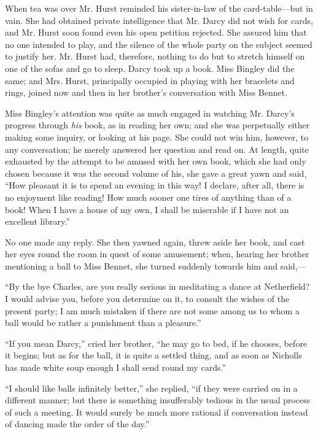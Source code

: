 \documentclass[12pt,openright]{book}
\begin{document}
When tea was over Mr. Hurst reminded his sister-in-law of the card-table—but in vain. She had obtained private intelligence that Mr. Darcy did not wish for cards, and Mr. Hurst soon found even his open petition rejected. She assured him that no one intended to play, and the silence of the whole party on the subject seemed to justify her. Mr. Hurst had, therefore, nothing to do but to stretch himself on one of the sofas and go to sleep. Darcy took up a book. Miss Bingley did the same; and Mrs. Hurst, principally occupied in playing with her bracelets and rings, joined now and then in her brother’s conversation with Miss Bennet.

Miss Bingley’s attention was quite as much engaged in watching Mr. Darcy’s progress through \textit{his} book, as in reading her own; and she was perpetually either making some inquiry, or looking at his page. She could not win him, however, to any conversation; he merely answered her question and read on. At length, quite exhausted by the attempt to be amused with her own book, which she had only chosen because it was the second volume of his, she gave a great yawn and said, “How pleasant it is to spend an evening in this way! I declare, after all, there is no enjoyment like reading! How much sooner one tires of anything than of a book! When I have a house of my own, I shall be miserable if I have not an excellent library.”

No one made any reply. She then yawned again, threw aside her book, and cast her eyes round the room in quest of some amusement; when, hearing her brother mentioning a ball to Miss Bennet, she turned suddenly towards him and said,—

“By the bye Charles, are you really serious in meditating a dance at Netherfield? I would advise you, before you determine on it, to consult the wishes of the present party; I am much mistaken if there are not some among us to whom a ball would be rather a punishment than a pleasure.”

“If you mean Darcy,” cried her brother, “he may go to bed, if he chooses, before it begins; but as for the ball, it is quite a settled thing, and as soon as Nicholls has made white soup enough I shall send round my cards.”

“I should like balls infinitely better,” she replied, “if they were carried on in a different manner; but there is something insufferably tedious in the usual process of such a meeting. It would surely be much more rational if conversation instead of dancing made the order of the day.”
\end{document}
